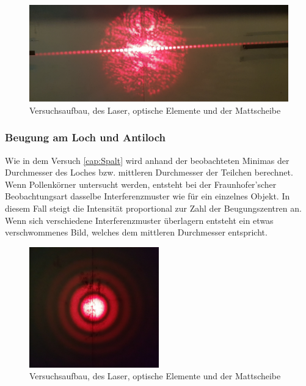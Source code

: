 \begin{figure}[h!]
	\centering
	\includegraphics[width=\textwidth]{data/versuch_spalt}
	\caption{Versuchsaufbau, des Laser, optische Elemente und der Mattscheibe}
	\label{fig:versuch_spalt}
\end{figure}

\subsubsection{Beugung am Loch und Antiloch}
Wie in dem Versuch \ref{cap:Spalt} wird anhand der beobachteten Minimas der Durchmesser des Loches bzw. mittleren Durchmesser der Teilchen berechnet. Wenn Pollenkörner untersucht werden, entsteht bei der Fraunhofer'scher Beobachtungsart dasselbe Interferenzmuster wie für ein einzelnes Objekt. In diesem Fall steigt die Intensität proportional zur Zahl der Beugungszentren an. Wenn sich verschiedene Interferenzmuster überlagern entsteht ein etwas verschwommenes Bild, welches dem mittleren Durchmesser entspricht.

\begin{figure}[h!]
	\centering
	\includegraphics[width=0.5\textwidth]{data/versuch_loch}
	\caption{Versuchsaufbau, des Laser, optische Elemente und der Mattscheibe}
	\label{fig:loch}
\end{figure}
\newpage
